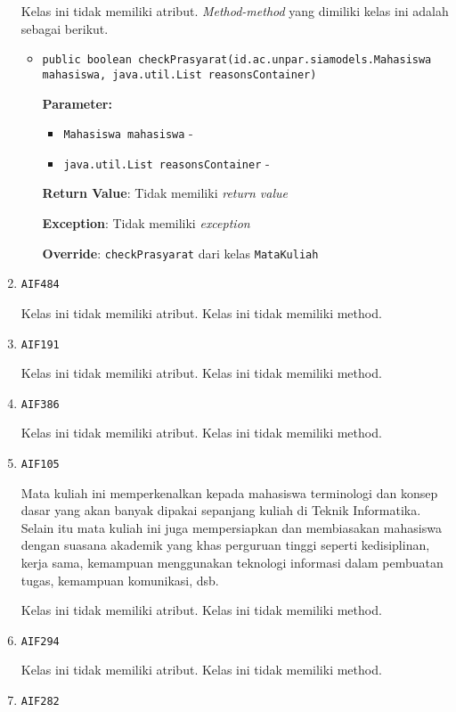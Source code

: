 \documentclass{article}
\begin{document}
\begin{enumerate}
Kelas ini tidak memiliki atribut. \textit{Method-method} yang dimiliki kelas ini adalah sebagai berikut.
\begin{itemize}
\item \texttt{public boolean checkPrasyarat(id.ac.unpar.siamodels.Mahasiswa mahasiswa, java.util.List reasonsContainer)}

\textbf{Parameter:}
\begin{itemize}
\item \texttt{Mahasiswa mahasiswa} - 
\item \texttt{java.util.List reasonsContainer} - 
\end{itemize}
\textbf{Return Value}: Tidak memiliki \textit{return value}

\textbf{Exception}: Tidak memiliki \textit{exception}

\textbf{Override}: \texttt{checkPrasyarat} dari kelas \texttt{MataKuliah}

\end{itemize}
\item \texttt{AIF484}



Kelas ini tidak memiliki atribut. Kelas ini tidak memiliki method. \item \texttt{AIF191}



Kelas ini tidak memiliki atribut. Kelas ini tidak memiliki method. \item \texttt{AIF386}



Kelas ini tidak memiliki atribut. Kelas ini tidak memiliki method. \item \texttt{AIF105}

Mata kuliah ini memperkenalkan kepada mahasiswa terminologi dan konsep dasar 
 yang akan banyak dipakai sepanjang kuliah di Teknik Informatika. Selain itu 
 mata kuliah ini juga mempersiapkan dan membiasakan mahasiswa dengan suasana 
 akademik yang khas perguruan tinggi seperti kedisiplinan, kerja sama, 
 kemampuan menggunakan teknologi informasi dalam pembuatan tugas, kemampuan 
 komunikasi, dsb.

Kelas ini tidak memiliki atribut. Kelas ini tidak memiliki method. \item \texttt{AIF294}



Kelas ini tidak memiliki atribut. Kelas ini tidak memiliki method. \item \texttt{AIF282}




\end{enumerate}
\end{document}
